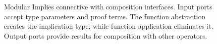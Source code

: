 \documentclass[letterpaper]{article}
\begin{document}
\begin{figure}[h!]
\begin{tikzpicture}[node distance=2.5cm and 2.5cm]
\end{tikzpicture}
\caption{Modular Implies connective with composition interfaces. Input ports accept type parameters and proof terms. The function abstraction creates the implication type, while function application eliminates it. Output ports provide results for composition with other operators.}
\label{fig:implies_modular}
\end{figure}
\end{document}
